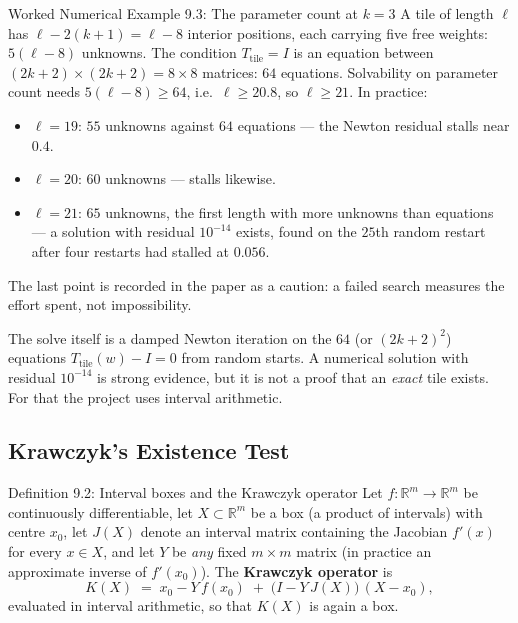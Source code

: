 \documentclass[11pt]{article}
\begin{document}
\begin{callbox}{Worked Numerical Example 9.3: The parameter count at $k=3$}
A tile of length $\ell$ has $\ell-2(k+1)=\ell-8$ interior positions, each carrying five free weights: $5(\ell-8)$ unknowns. The condition $T_{\text{tile}}=I$ is an equation between $(2k+2)\times(2k+2)=8\times8$ matrices: $64$ equations. Solvability on parameter count needs $5(\ell-8)\ge64$, i.e.\ $\ell\ge20.8$, so $\ell\ge21$. In practice:
\begin{itemize}[leftmargin=*,nosep]
  \item $\ell=19$: $55$ unknowns against $64$ equations --- the Newton residual stalls near $0.4$.
  \item $\ell=20$: $60$ unknowns --- stalls likewise.
  \item $\ell=21$: $65$ unknowns, the first length with more unknowns than equations --- a solution with residual $10^{-14}$ exists, found on the $25$th random restart after four restarts had stalled at $0.056$.
\end{itemize}
The last point is recorded in the paper as a caution: a failed search measures the effort spent, not impossibility.
\end{callbox}

The solve itself is a damped Newton iteration on the $64$ (or $(2k+2)^2$) equations $T_{\text{tile}}(w)-I=0$ from random starts. A numerical solution with residual $10^{-14}$ is strong evidence, but it is not a proof that an \emph{exact} tile exists. For that the project uses interval arithmetic.

\subsection{Krawczyk's Existence Test}

\begin{defbox}{Definition 9.2: Interval boxes and the Krawczyk operator}
Let $f:\mathbb R^m\to\mathbb R^m$ be continuously differentiable, let $X\subset\mathbb R^m$ be a box (a product of intervals) with centre $x_0$, let $J(X)$ denote an interval matrix containing the Jacobian $f'(x)$ for every $x\in X$, and let $Y$ be \emph{any} fixed $m\times m$ matrix (in practice an approximate inverse of $f'(x_0)$). The \textbf{Krawczyk operator} is
\begin{equation}
  K(X)\;=\;x_0-Y\,f(x_0)\;+\;\bigl(I-Y\,J(X)\bigr)\,(X-x_0),
\end{equation}
evaluated in interval arithmetic, so that $K(X)$ is again a box.
\end{defbox}
\end{document}
